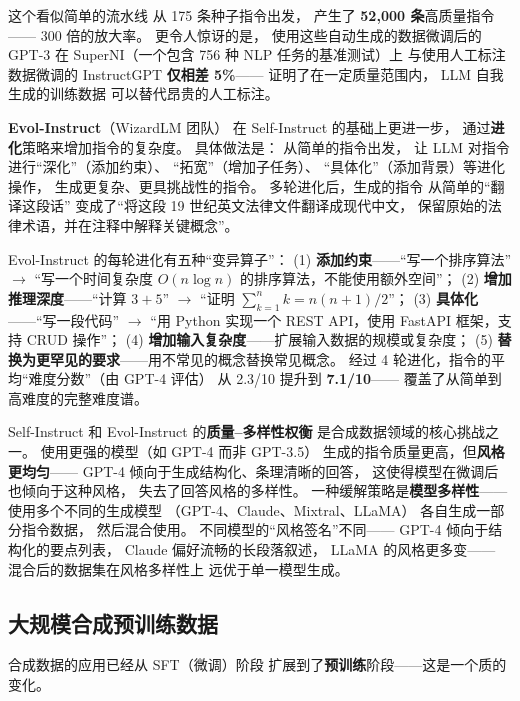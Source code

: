 这个看似简单的流水线
从 175 条种子指令出发，
产生了 \textbf{52,000 条}高质量指令——
300 倍的放大率。
更令人惊讶的是，
使用这些自动生成的数据微调后的 GPT-3
在 SuperNI（一个包含 756 种 NLP 任务的基准测试）上
与使用人工标注数据微调的 InstructGPT
\textbf{仅相差 5\%}——
证明了在一定质量范围内，
LLM 自我生成的训练数据
可以替代昂贵的人工标注。

\textbf{Evol-Instruct}（WizardLM 团队）
在 Self-Instruct 的基础上更进一步，
通过\textbf{进化}策略来增加指令的复杂度。
具体做法是：
从简单的指令出发，
让 LLM 对指令进行``深化''（添加约束）、
``拓宽''（增加子任务）、
``具体化''（添加背景）等进化操作，
生成更复杂、更具挑战性的指令。
多轮进化后，生成的指令
从简单的``翻译这段话''
变成了``将这段 19 世纪英文法律文件翻译成现代中文，
保留原始的法律术语，并在注释中解释关键概念''。

Evol-Instruct 的每轮进化有五种``变异算子''：
(1) \textbf{添加约束}——``写一个排序算法'' $\to$ ``写一个时间复杂度 $O(n\log n)$ 的排序算法，不能使用额外空间''；
(2) \textbf{增加推理深度}——``计算 $3 + 5$'' $\to$ ``证明 $\sum_{k=1}^{n} k = n(n+1)/2$''；
(3) \textbf{具体化}——``写一段代码'' $\to$ ``用 Python 实现一个 REST API，使用 FastAPI 框架，支持 CRUD 操作''；
(4) \textbf{增加输入复杂度}——扩展输入数据的规模或复杂度；
(5) \textbf{替换为更罕见的要求}——用不常见的概念替换常见概念。
经过 4 轮进化，指令的平均``难度分数''（由 GPT-4 评估）
从 2.3/10 提升到 \textbf{7.1/10}——
覆盖了从简单到高难度的完整难度谱。

Self-Instruct 和 Evol-Instruct 的\textbf{质量--多样性权衡}
是合成数据领域的核心挑战之一。
使用更强的模型（如 GPT-4 而非 GPT-3.5）
生成的指令质量更高，但\textbf{风格更均匀}——
GPT-4 倾向于生成结构化、条理清晰的回答，
这使得模型在微调后也倾向于这种风格，
失去了回答风格的多样性。
一种缓解策略是\textbf{模型多样性}——
使用多个不同的生成模型
（GPT-4、Claude、Mixtral、LLaMA）
各自生成一部分指令数据，
然后混合使用。
不同模型的``风格签名''不同——
GPT-4 倾向于结构化的要点列表，
Claude 偏好流畅的长段落叙述，
LLaMA 的风格更多变——
混合后的数据集在风格多样性上
远优于单一模型生成。

\subsection{大规模合成预训练数据}

合成数据的应用已经从 SFT（微调）阶段
扩展到了\textbf{预训练}阶段——这是一个质的变化。

